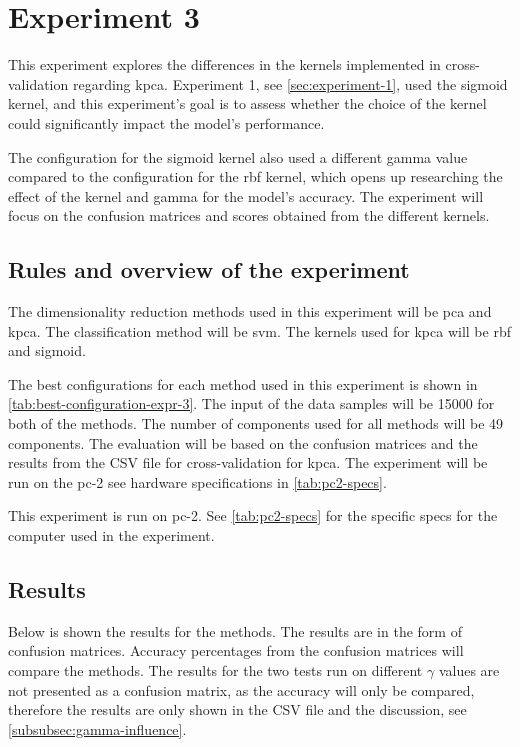 \section{Experiment 3}\label{sec:experiment-3}
This experiment explores the differences in the kernels implemented in cross-validation regarding \gls{kpca}. Experiment 1, see \autoref{sec:experiment-1}, used the sigmoid kernel, and this experiment's goal is to assess whether the choice of the kernel could significantly impact the model's performance.

The configuration for the sigmoid kernel also used a different gamma value compared to the configuration for the \gls{rbf} kernel, which opens up researching the effect of the kernel and gamma for the model's accuracy. The experiment will focus on the confusion matrices and scores obtained from the different kernels.


\subsection{Rules and overview of the experiment}
The dimensionality reduction methods used in this experiment will be \gls{pca} and \gls{kpca}. The classification method will be \gls{svm}. The kernels used for \gls{kpca} will be \gls{rbf} and sigmoid.

The best configurations for each method used in this experiment is shown in \autoref{tab:best-configuration-expr-3}. The input of the data samples will be 15000 for both of the methods. The number of components used for all methods will be 49 components. The evaluation will be based on the confusion matrices and the results from the CSV file for cross-validation for \gls{kpca}. The experiment will be run on the pc-2 see hardware specifications in \autoref{tab:pc2-specs}.

This experiment is run on pc-2. See \autoref{tab:pc2-specs} for the specific specs for the computer used in the experiment.



\subsection{Results}\label{subsec:experiment-3-results}
Below is shown the results for the methods. The results are in the form of confusion matrices. Accuracy percentages from the confusion matrices will compare the methods. The results for the two tests run on different $\gamma$ values are not presented as a confusion matrix, as the accuracy will only be compared, therefore the results are only shown in the CSV file and the discussion, see \autoref{subsubsec:gamma-influence}.

